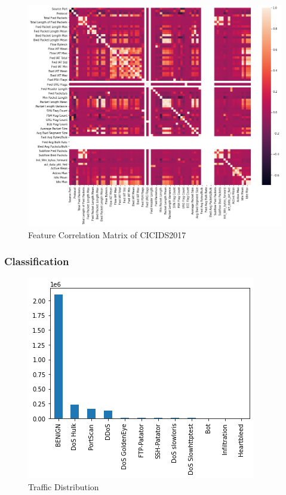 \begin{figure}[h!]
    \centering
    \includegraphics[scale=0.5]{assets/figures/chapter3/feature-correlation.png}
    \caption{Feature Correlation Matrix of CICIDS2017}
    \label{fig:feature-correlation}
\end{figure}


\subsubsection{Classification}
\label{subsubsec:ac-classification}

\textcolor{dimgray}{\lipsum[1]}

\begin{figure}[h!]
    \centering
    \includegraphics[scale=0.6]{assets/figures/chapter3/traffic_distribution.png}
    \caption{Traffic Distribution}
    \label{fig:traffic-distribution}
\end{figure}

